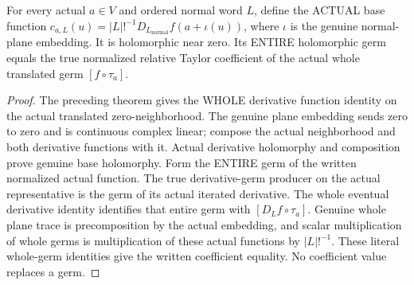 \begin{theorem}
\label{hir:relative-normal-translated-taylor-entire-coefficient-functions}
\leanok
{}
For every actual $a\in V$ and ordered normal word $L$, define the ACTUAL base
function
$c_{a,L}(u)=|L|!^{-1}D_{L_{\mathrm{normal}}}f(a+\iota(u))$, where $\iota$ is
the genuine normal-plane embedding. It is holomorphic near zero. Its ENTIRE
holomorphic germ equals the true normalized relative Taylor coefficient of
the actual whole translated germ $[f\circ\tau_a]$.
\end{theorem}
\begin{proof}
The preceding theorem gives the WHOLE derivative function identity on the
actual translated zero-neighborhood. The genuine plane embedding sends zero
to zero and is continuous complex linear; compose the actual neighborhood
and both derivative functions with it. Actual derivative holomorphy and
composition prove genuine base holomorphy. Form the ENTIRE germ of the
written normalized actual function. The true derivative-germ producer on
the actual representative is the germ of its actual iterated derivative.
The whole eventual derivative identity identifies that entire germ with
$[D_Lf\circ\tau_a]$. Genuine whole plane trace is precomposition by the actual
embedding, and scalar multiplication of whole germs is multiplication of
these actual functions by $|L|!^{-1}$. These literal whole-germ identities
give the written coefficient equality. No coefficient value replaces a germ.
\end{proof}

